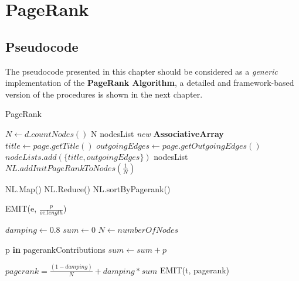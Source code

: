 \section{PageRank}

\subsection{Pseudocode}
The pseudocode presented in this chapter should be considered as a \textit{generic} implementation of the \textbf{PageRank Algorithm}, a detailed and framework-based version of the procedures is shown in the next chapter.

\begin{algorithm}[H]
	\caption{PageRank}\label{General}
		\begin{algorithmic}[1]
			
				\State $N \gets d.countNodes()$
				\State \Return N
			\EndProcedure
\newline			
				\State nodesList \textit{new} \textbf{AssociativeArray}
					\State $title \gets page.getTitle()$
					\State $outgoingEdges \gets page.getOutgoingEdges()$
					\State $nodeLists.add(\{ title, outgoingEdges\}) $
				\EndFor
				\State \Return nodesList
			\EndProcedure
	\newline		
				\State $NL.addInitPageRankToNodes(\frac{1}{N})$
				
					\State NL.Map()
					\State NL.Reduce()
				\EndFor
				\State NL.sortByPagerank()
				
			\EndProcedure
\newline
					\State EMIT(e, $\frac{p}{oe.length}$)
				\EndFor
			\EndProcedure
						
				\State $damping \gets 0.8$
				\State $sum \gets 0$
				\State $N \gets numberOfNodes$
				
				\ForAll p \textbf{in} pagerankContributions
					\State $sum \gets sum + p$
				\EndFor
				
				\State $pagerank =  \frac{(1-damping)}{N} + damping*sum$
				\State EMIT(t, pagerank)
			\EndProcedure
	\end{algorithmic}
\end{algorithm}
